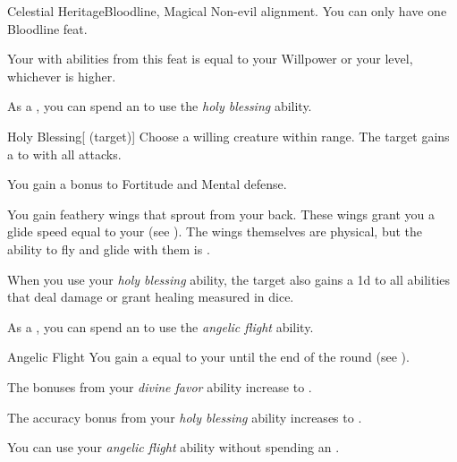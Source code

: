     \begin{feat}{Celestial Heritage}{Bloodline, Magical}
        \featpre Non-evil alignment.
         You can only have one Bloodline feat.

         Your  with abilities from this feat is equal to your Willpower or your level, whichever is higher.

         As a , you can spend an  to use the \textit{holy blessing} ability.
        \begin{ability}{Holy Blessing}[ (target)]
            Choose a willing creature within \rngclose range.
            The target gains a   to  with all attacks.
        \end{ability}

         You gain a  bonus to Fortitude and Mental defense.

         You gain feathery wings that sprout from your back.
        These wings grant you a glide speed equal to your  (see ).
        The wings themselves are physical, but the ability to fly and glide with them is .

         When you use your \textit{holy blessing} ability, the target also gains a \plus1d  to all abilities that deal damage or grant healing measured in dice.

         As a , you can spend an  to use the \textit{angelic flight} ability.
        \begin{ability}{Angelic Flight}
            You gain a  equal to your  until the end of the round (see ).
        \end{ability}

         The bonuses from your \textit{divine favor} ability increase to .

         The accuracy bonus from your \textit{holy blessing} ability increases to .

         You can use your \textit{angelic flight} ability without spending an .
    \end{feat}

